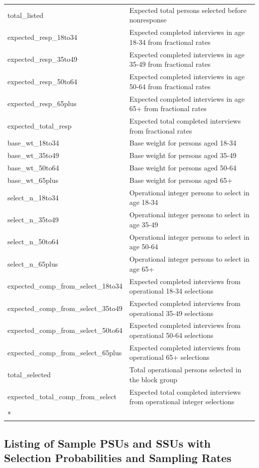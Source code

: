 \documentclass[
  11pt,
  letterpaper,
  DIV=11,
  numbers=noendperiod]{scrartcl}
\begin{document}
\begin{longtable}[t]{ll}
total\_listed & Expected total persons selected before nonresponse\\
expected\_resp\_18to34 & Expected completed interviews in age 18-34 from fractional rates\\
expected\_resp\_35to49 & Expected completed interviews in age 35-49 from fractional rates\\
expected\_resp\_50to64 & Expected completed interviews in age 50-64 from fractional rates\\
expected\_resp\_65plus & Expected completed interviews in age 65+ from fractional rates\\
expected\_total\_resp & Expected total completed interviews from fractional rates\\
base\_wt\_18to34 & Base weight for persons aged 18-34\\
base\_wt\_35to49 & Base weight for persons aged 35-49\\
base\_wt\_50to64 & Base weight for persons aged 50-64\\
base\_wt\_65plus & Base weight for persons aged 65+\\
select\_n\_18to34 & Operational integer persons to select in age 18-34\\
select\_n\_35to49 & Operational integer persons to select in age 35-49\\
select\_n\_50to64 & Operational integer persons to select in age 50-64\\
select\_n\_65plus & Operational integer persons to select in age 65+\\
expected\_comp\_from\_select\_18to34 & Expected completed interviews from operational 18-34 selections\\
expected\_comp\_from\_select\_35to49 & Expected completed interviews from operational 35-49 selections\\
expected\_comp\_from\_select\_50to64 & Expected completed interviews from operational 50-64 selections\\
expected\_comp\_from\_select\_65plus & Expected completed interviews from operational 65+ selections\\
total\_selected & Total operational persons selected in the block group\\
expected\_total\_comp\_from\_select & Expected total completed interviews from operational integer selections\\*
\end{longtable}
\endgroup{}

\subsection{Listing of Sample PSUs and SSUs with Selection Probabilities
and Sampling
Rates}\label{listing-of-sample-psus-and-ssus-with-selection-probabilities-and-sampling-rates}
\end{document}
